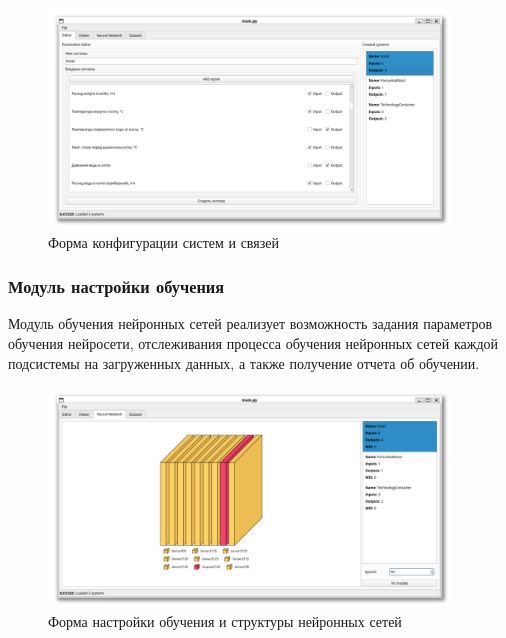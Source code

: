 \begin{figure}[H]
  \begin{center}
    \includegraphics[width=0.95\textwidth]{figures/modules/editor.png}
  \end{center}
  \caption{Форма конфигурации систем и связей}\label{fig:forms:editor}
\end{figure}

\subsubsection{Модуль настройки обучения}

Модуль обучения нейронных сетей реализует возможность задания параметров
обучения нейросети, отслеживания процесса обучения нейронных сетей каждой
подсистемы на загруженных данных, а также получение отчета об обучении. 

\begin{figure}[H]
  \begin{center}
    \includegraphics[width=0.95\textwidth]{figures/modules/neural.png}
  \end{center}
  \caption{Форма настройки обучения и структуры нейронных
  сетей}\label{fig:forms:neural}
\end{figure}

